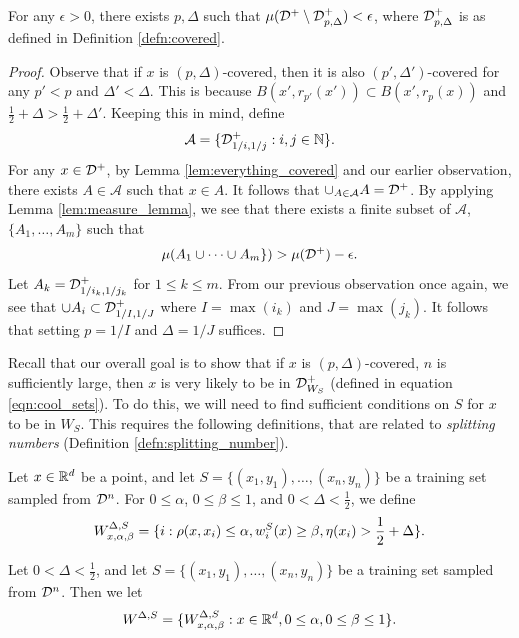 \begin{lem}\label{lem:most_covered}
For any $\epsilon > 0$, there exists $p, \Delta$ such that $\mu({\mathcal D}^+ \setminus {\mathcal D}_{p, \Delta}^+) < \epsilon$, where ${\mathcal D}_{p, \Delta}^+$ is as defined in Definition \ref{defn:covered}. 
\end{lem}

\begin{proof}
Observe that if $x$ is $(p, \Delta)$-covered, then it is also $(p', \Delta')$-covered for any $p' < p$ and $\Delta' < \Delta$. This is because $B(x', r_{p'}(x')) \subset B(x', r_p(x))$ and $\frac{1}{2} + \Delta > \frac{1}{2} + \Delta'$. Keeping this in mind, define $$\mathcal{A} = \{{\mathcal D}_{1/i, 1/j}^+: i, j \in \mathbb{N}\}.$$ For any $x \in {\mathcal D}^+$, by Lemma \ref{lem:everything_covered} and our earlier observation, there exists $A \in \mathcal{A}$ such that $x \in A$. It follows that $\cup_{A \in \mathcal{A}} A = {\mathcal D}^+$. By applying Lemma \ref{lem:measure_lemma}, we see that there exists a finite subset of $\mathcal{A}$, $\{A_1, \dots, A_m\}$ such that $$\mu(A_1 \cup \dots \cup A_m\}) > \mu({\mathcal D}^+) - \epsilon.$$ Let $A_k = {\mathcal D}_{1/i_k, 1/j_k}^+$ for $1 \leq k \leq m$. From our previous observation once again, we see that $\cup A_i \subset {\mathcal D}_{1/I, 1/J}^+$ where  $I = \max(i_k)$ and $J = \max(j_k)$. It follows that setting $p = 1/I$ and $\Delta = 1/J$ suffices. 
\end{proof}

Recall that our overall goal is to show that if $x$ is $(p, \Delta)$-covered, $n$ is sufficiently large, then $x$ is very likely to be in ${\mathcal D}_{W_S}^+$ (defined in equation \ref{eqn:cool_sets}). To do this, we will need to find sufficient conditions on $S$ for $x$ to be in $W_S$. This requires the following definitions, that are related to \textit{splitting numbers} (Definition \ref{defn:splitting_number}). 

\begin{defn}\label{defn:Delta_particular_split_thing}
Let $x \in \mathbb R^d$ be a point, and let $S = \{(x_1, y_1), \dots, (x_n, y_n)\}$ be a training set sampled from ${\mathcal D}^n$. For $0 \leq \alpha$, $0 \leq \beta \leq 1$, and $0 < \Delta < \frac{1}{2}$, we define $$W_{x, \alpha, \beta}^{\Delta, S} = \{i: \rho(x, x_i) \leq \alpha, w_i^S(x) \geq \beta, \eta(x_i) > \frac{1}{2} + \Delta\}.$$
\end{defn}

\begin{defn}
Let $0 < \Delta < \frac{1}{2}$, and let $S = \{(x_1, y_1), \dots, (x_n, y_n)\}$ be a training set sampled from ${\mathcal D}^n$. Then we let $$W^{\Delta, S} = \{W_{x, \alpha, \beta}^{\Delta, S}: x \in \mathbb R^d, 0 \leq \alpha, 0 \leq \beta \leq 1\}.$$
\end{defn}

